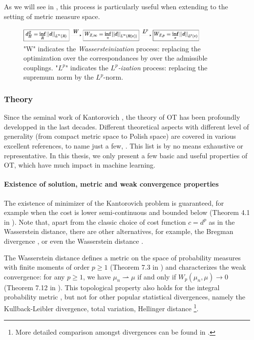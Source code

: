 As we will see in , this process is particularly useful
when extending to the setting of metric measure space.
\begin{figure}[ht]
  \centering
  \includegraphics[width=0.85\textwidth,keepaspectratio]{Chapitre1/figures/wass_motiv.pdf}
  \caption{"W" indicates the \textit{Wassersteinization} process: replacing the optimization over the correspondances by over the admissible couplings.
  "$L^p$" indicates the \textit{$L^p$-ization} process: replacing the supremum norm by the $L^p$-norm.}
  \label{fig:wass_motiv}
\end{figure}
\subsubsection{Theory}
Since the seminal work of Kantorovich \citep{Kanto42},
the theory of OT has been profoundly developped in the last decades.
Different theoretical aspects with different level of generality
(from compact metric space to Polish space) are covered in various excellent references,
to name just a few, \citep{Villani03,Villani08,Fillipo15,Ambrosio05}. This list is
by no means exhaustive or representative. In this thesis, we only present a few
basic and useful properties of OT, which have much impact in machine learning.

\paragraph{Existence of solution, metric and weak convergence properties}
The existence of minimizer of the Kantorovich problem is guaranteed,
for example when the cost is lower semi-continuous and bounded below
(Theorem 4.1 in \citep{Villani08}). Note that,
apart from the classic choice of cost function $c = d^p$ as in the Wasserstein distance,
there are other alternatives, for example, the Bregman divergence \citep{Guo21},
or even the Wasserstein distance \citep{Huizing22}.

The Wasserstein distance defines a metric
on the space of probability measures with finite moments of order $p \geq 1$
(Theorem 7.3 in \citep{Villani03}) and characterizes the weak convergence: for any $p \geq 1$,
we have $\mu_n \rightharpoonup \mu$ if and only if $W_p(\mu_n, \mu) \to 0$
(Theorem 7.12 in \citep{Villani03}).
This topological property also holds for the integral probability metric \citep{Muller97},
but not for other popular statistical divergences, namely the Kullback-Leibler divergence,
total variation, Hellinger distance
\footnote{More detailed comparison amongst divergences can be found in \citep{Gibbs02}.}.

